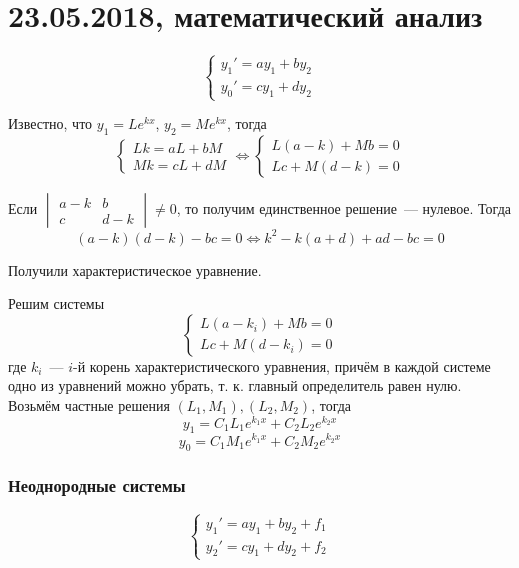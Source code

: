 \chapter{23.05.2018, математический анализ}
\begin{equation*}
\begin{cases}
y_1' = a y_1 + b y_2 \\
y_0' = c y_1 + d y_2
\end{cases}
\end{equation*}

Известно, что $y_1 = L e^{kx}$, $y_2 = M e^{kx}$, тогда
\begin{equation*}
\begin{cases}
Lk = aL + bM \\
Mk = cL + dM
\end{cases}
\Leftrightarrow
\begin{cases}
L (a - k) + M b = 0 \\
L c + M (d - k) = 0
\end{cases}
\end{equation*}

Если $\begin{vmatrix}
a - k & b \\
c & d - k
\end{vmatrix} \neq 0$, то получим единственное решение~--- нулевое.
Тогда
\begin{equation*}
(a - k)(d - k) - bc = 0 \Leftrightarrow
k^2 - k (a + d) + ad - bc = 0
\end{equation*}

Получили характеристическое уравнение.

Решим системы
\begin{equation*}
\begin{cases}
L (a - k_i) + M b = 0 \\
L c + M (d - k_i) = 0
\end{cases}
\end{equation*}
где $k_i$~--- $i$-й корень характеристического уравнения, причём в каждой системе одно из уравнений можно убрать, т. к. главный определитель равен нулю.
Возьмём частные решения $(L_1, M_1), (L_2, M_2)$, тогда
\begin{equation*}
y_1 = C_1 L_1 e^{k_1 x} + C_2 L_2 e^{k_2 x}
\end{equation*}
\begin{equation*}
y_0 = C_1 M_1 e^{k_1 x} + C_2 M_2 e^{k_2 x}
\end{equation*}

\subsection{Неоднородные системы}
\begin{equation*}
\begin{cases}
y_1' = a y_1 + b y_2 + f_1 \\
y_2' = c y_1 + d y_2 + f_2
\end{cases}
\end{equation*}

